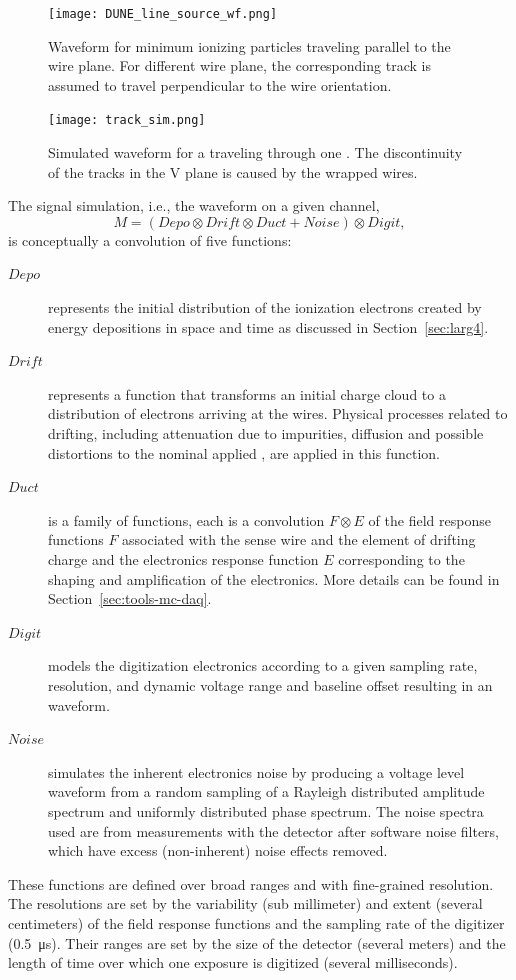 \begin{figure}[htbp]
  \centering
        \texttt{[image: DUNE\_line\_source\_wf.png]}
        \caption{Waveform for minimum ionizing particles traveling parallel to the wire plane. For different
        wire plane, the corresponding track is assumed to travel perpendicular to the wire orientation. 
        }\label{fig:simevent_wf}
         \texttt{[image: track\_sim.png]}
    \caption{Simulated waveform for a  traveling through one . The discontinuity of the 
    tracks in the V plane is caused by the wrapped wires.}
  \label{fig:simevent}
\end{figure}

The signal simulation, i.e., the  waveform on a given channel, 
\begin{equation}
  \label{eq:sim-convolution}
    M = (Depo \otimes Drift \otimes Duct + Noise) \otimes Digit, 
\end{equation}
is conceptually a convolution of five functions:
\begin{description}
\item[$Depo$] represents the initial distribution of the ionization electrons created by energy depositions in space and time as
discussed in Section~\ref{sec:larg4}.
\item[$Drift$] represents a function that transforms an initial charge cloud to a distribution of electrons arriving at the wires. Physical processes related to drifting, including attenuation due to impurities, diffusion and possible distortions to the nominal applied \efield, are applied in this function.
\item[$Duct$] is a family of functions, each is a convolution $F \otimes E$ of the field response functions $F$ associated with the sense wire and the element of drifting charge and the electronics response function $E$ corresponding to the shaping and amplification of the  electronics. More details can be found in Section~\ref{sec:tools-mc-daq}.
\item[$Digit$] models the digitization electronics according to a given sampling rate, resolution, and dynamic voltage range and baseline offset resulting in an  waveform. 
\item[$Noise$] simulates the inherent electronics noise by producing a voltage level waveform from a random sampling of a Rayleigh distributed amplitude spectrum and uniformly distributed phase spectrum.  The noise spectra used are from measurements with the  detector after software noise filters, which have excess (non-inherent) noise effects removed.
\end{description}
%
These functions are defined over broad ranges and with fine-grained resolution. The resolutions are set by the variability (sub millimeter) and extent (several centimeters) of the field response functions and the sampling rate of the digitizer (\SI{0.5}{\micro\second}). Their ranges are set by the size of the detector (several meters) and the length of time over which one exposure is digitized (several milliseconds).  


